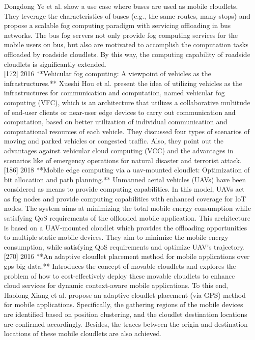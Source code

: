 Dongdong Ye et al. \cite{ye2016scalable} show a use case where buses are used as mobile cloudlets. They leverage the characteristics of buses (e.g., the same routes, many stops) and propose a scalable fog computing paradigm with servicing offloading in bus networks. The bus fog servers not only provide fog computing services for the mobile users on bus, but also are motivated to accomplish the computation tasks offloaded by roadside cloudlets. By this way, the computing capability of roadside cloudlets is significantly extended.\\

[172] 2016 **Vehicular fog computing: A viewpoint of vehicles as the infrastructures.**
Xueshi Hou et al. present the idea of utilizing vehicles as the infrastructures for communication and computation, named vehicular fog computing (VFC), which is an architecture that utilizes a collaborative multitude of end-user clients or near-user edge devices to carry out communication and computation, based on better utilization of individual communication and computational resources of each vehicle. They discussed four types of scenarios of moving and parked vehicles or congested traffic. Also, they point out the advantages against vehicular cloud computing (VCC) and the advantages in scenarios like of emergency operations for natural disaster and terrorist attack.\\

[186] 2018 **Mobile edge computing via a uav-mounted cloudlet: Optimization of bit allocation and path planning.**
Unmanned aerial vehicles (UAVs) have been considered as means to provide computing capabilities. In this model, UAVs act as fog nodes and provide computing capabilities with enhanced coverage for IoT nodes. The system aims at minimizing the total mobile energy consumption while satisfying QoS requirements of the offloaded mobile application. This architecture is based on a UAV-mounted cloudlet which provides the offloading opportunities to multiple static mobile devices. They aim to minimize the mobile energy consumption, while satisfying QoS requirements and optimize UAV’s trajectory.\\

[270] 2016 **An adaptive cloudlet placement method for mobile applications over gps big data.**
Introduces the concept of movable cloudlets and explores the problem of how to cost-effectively deploy these movable cloudlets to enhance cloud services for dynamic context-aware mobile applications. To this end, Haolong Xiang et al. propose an adaptive cloudlet placement (via GPS) method for mobile applications. Specifically, the gathering regions of the mobile devices are identified based on position clustering, and the cloudlet destination locations are confirmed accordingly. Besides, the traces between the origin and destination locations of these mobile cloudlets are also achieved.\\






